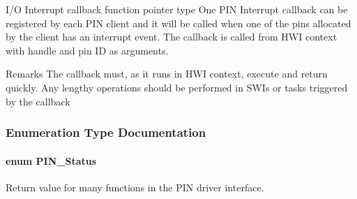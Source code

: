 I/\-O Interrupt callback function pointer type One P\-I\-N Interrupt callback can be registered by each P\-I\-N client and it will be called when one of the pins allocated by the client has an interrupt event. The callback is called from H\-W\-I context with handle and pin I\-D as arguments. 

\begin{DoxyRemark}{Remarks}
The callback must, as it runs in H\-W\-I context, execute and return quickly. Any lengthy operations should be performed in S\-W\-Is or tasks triggered by the callback 
\end{DoxyRemark}


\subsubsection{Enumeration Type Documentation}
\paragraph[{P\-I\-N\-\_\-\-Status}]{\setlength{\rightskip}{0pt plus 5cm}enum {\bf P\-I\-N\-\_\-\-Status}}\label{_p_i_n_8h_abe0ad59bbf09e51fe37195a5e70b23f6}


Return value for many functions in the P\-I\-N driver interface. 

